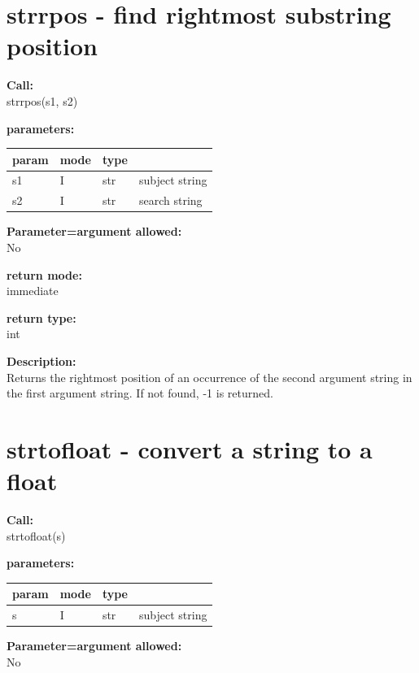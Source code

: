     \section{strrpos - find rightmost substring position}\label{sec:ifstrrpos}
        
        {\bf Call:} \\
        strrpos(s1, s2)
        
        {\bf parameters:} \\
        \begin{tabular}{| l | l | l | l |}
        \hline
        param  & mode & type & \\
        \hline \hline
        s1 & I & str & subject string   \\ \hline
        s2 & I & str & search string    \\ \hline
        \end{tabular}
        
        {\bf Parameter=argument allowed:} \\
        No
        
        {\bf return mode:} \\
        immediate

        {\bf return type:} \\
        int
        
        {\bf Description:} \\
        Returns the rightmost position of an occurrence of the second argument
        string in the first argument string. If not found, -1 is returned.


    \section{strtofloat - convert a string to a float}\label{sec:ifstof}
        
        {\bf Call:} \\
        strtofloat(s)
        
        {\bf parameters:} \\
        \begin{tabular}{| l | l | l | l |}
        \hline
        param  & mode & type & \\
        \hline \hline
        s & I & str & subject string   \\ \hline
        \end{tabular}
        
        {\bf Parameter=argument allowed:} \\
        No
        
